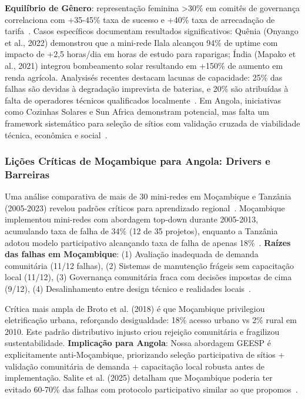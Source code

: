 \documentclass[12pt, a4paper]{article}
\begin{document}
\textbf{Equilíbrio de Gênero}: representação feminina >30\% em comitês de governança correlaciona com +35-45\% taxa de sucesso e +40\% taxa de arrecadação de tarifa~\citep{Clancy2021, Cecelski2020}. Casos específicos documentam resultados significativos: Quênia (Onyango et al., 2022) demonstrou que a mini-rede Ilala alcançou 94\% de uptime com impacto de +2,5 horas/dia em horas de estudo para raparigas; Índia (Mapako et al., 2021) integrou bombeamento solar resultando em +150\% de aumento em renda agrícola. Analysisés recentes destacam lacunas de capacidade: 25\% das falhas são devidas à degradação imprevista de baterias, e 20\% são atribuídas à falta de operadores técnicos qualificados localmente~\citep{Duran2021}. Em Angola, iniciativas como Cozinhas Solares e Sun Africa demonstram potencial, mas falta um framework sistemático para seleção de sítios com validação cruzada de viabilidade técnica, econômica e social~\citep{SunAfrica2023}.

\subsubsection{Lições Críticas de Moçambique para Angola: Drivers e Barreiras}

Uma análise comparativa de mais de 30 mini-redes em Moçambique e Tanzânia (2005-2023) revelou padrões críticos para aprendizado regional~\citep{Ahlborg2014, Broto2018}. Moçambique implementou mini-redes com abordagem top-down durante 2005-2013, acumulando taxa de falha de 34\% (12 de 35 projetos), enquanto a Tanzânia adotou modelo participativo alcançando taxa de falha de apenas 18\%~\citep{Ahlborg2014}. \textbf{Raízes das falhas em Moçambique}: (1) Avaliação inadequada de demanda comunitária (11/12 falhas), (2) Sistemas de manutenção frágeis sem capacitação local (11/12), (3) Governança comunitária fraca com decisões impostas de cima (9/12), (4) Desalinhamento entre design técnico e realidades locais~\citep{Broto2018}. 

Crítica mais ampla de Broto et al. (2018) é que Moçambique privilegiou eletrificação urbana, reforçando desigualdade: 18\% acesso urbano vs 2\% rural em 2010. Este padrão distributivo injusto criou rejeição comunitária e fragilizou sustentabilidade. \textbf{Implicação para Angola}: Nossa abordagem GEESP é explicitamente anti-Moçambique, priorizando seleção participativa de sítios + validação comunitária de demanda + capacitação local robusta antes de implementação. Salite et al. (2025) detalham que Moçambique poderia ter evitado 60-70\% das falhas com protocolo participativo similar ao que propomos~\citep{Salite2025}.
\end{document}

